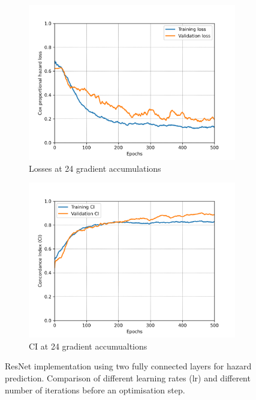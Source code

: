 \begin{figure}[h!t]
\begin{subfigure}[b]{0.49\textwidth}
     \includegraphics[width=\textwidth]{latex/loss_plots/24accums.png}
     \caption{Losses at 24 gradient accumulations}
    \end{subfigure}
    \hfill
     \begin{subfigure}[b]{0.49\textwidth}
         \centering
         \includegraphics[width=\textwidth]{latex/ci_plots/24accums.png}
         \caption{CI at 24 gradient accumualtions}
     \end{subfigure}
    \hfill
    \caption[Resnet with Double-Layer Prediction ]{ResNet implementation using two fully connected layers for hazard prediction. Comparison of different learning rates (lr) and different number of iterations before an optimisation step.}
    \label{fig:resnet_lr}
\end{figure}

